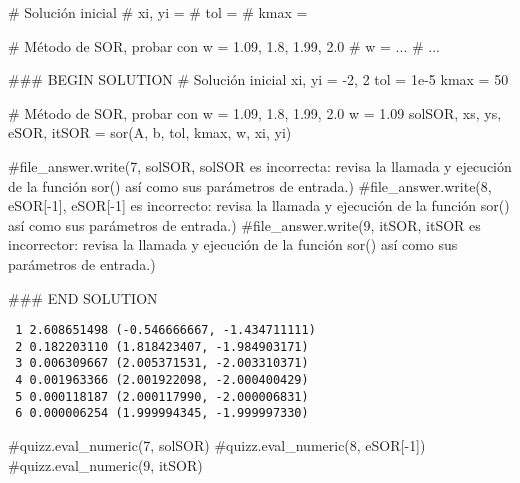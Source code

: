\documentclass[
  letterpaper,
  DIV=11,
  numbers=noendperiod]{scrreprt}
\newenvironment{Shaded}{\begin{snugshade}}{\end{snugshade}}
\newcommand{\CommentTok}[1]{\textcolor[rgb]{0.37,0.37,0.37}{#1}}
\newcommand{\DecValTok}[1]{\textcolor[rgb]{0.68,0.00,0.00}{#1}}
\newcommand{\FloatTok}[1]{\textcolor[rgb]{0.68,0.00,0.00}{#1}}
\newcommand{\NormalTok}[1]{\textcolor[rgb]{0.00,0.23,0.31}{#1}}
\newcommand{\OperatorTok}[1]{\textcolor[rgb]{0.37,0.37,0.37}{#1}}
\newcommand{\RegionMarkerTok}[1]{\textcolor[rgb]{0.00,0.23,0.31}{#1}}
\begin{document}
\begin{Shaded}
\begin{Highlighting}[]
\CommentTok{\# Solución inicial}
\CommentTok{\# xi, yi = }
\CommentTok{\# tol = }
\CommentTok{\# kmax = }

\CommentTok{\# Método de SOR, probar con w = 1.09, 1.8, 1.99, 2.0}
\CommentTok{\# w = ...}
\CommentTok{\# ...}

\CommentTok{\#\#\# }\RegionMarkerTok{BEGIN}\CommentTok{ SOLUTION}
\CommentTok{\# Solución inicial}
\NormalTok{xi, yi }\OperatorTok{=} \OperatorTok{{-}}\DecValTok{2}\NormalTok{, }\DecValTok{2}
\NormalTok{tol }\OperatorTok{=} \FloatTok{1e{-}5}
\NormalTok{kmax }\OperatorTok{=} \DecValTok{50}

\CommentTok{\# Método de SOR, probar con w = 1.09, 1.8, 1.99, 2.0}
\NormalTok{w }\OperatorTok{=} \FloatTok{1.09}
\NormalTok{solSOR, xs, ys, eSOR, itSOR }\OperatorTok{=}\NormalTok{ sor(A, b, tol, kmax, w, xi, yi)}

\CommentTok{\#file\_answer.write(\textquotesingle{}7\textquotesingle{}, solSOR, \textquotesingle{}solSOR es incorrecta: revisa la llamada y ejecución de la función sor() así como sus parámetros de entrada.\textquotesingle{})}
\CommentTok{\#file\_answer.write(\textquotesingle{}8\textquotesingle{}, eSOR[{-}1], \textquotesingle{}eSOR[{-}1] es incorrecto: revisa la llamada y ejecución de la función sor() así como sus parámetros de entrada.\textquotesingle{})}
\CommentTok{\#file\_answer.write(\textquotesingle{}9\textquotesingle{}, itSOR, \textquotesingle{}itSOR es incorrector: revisa la llamada y ejecución de la función sor() así como sus parámetros de entrada.\textquotesingle{})}

\CommentTok{\#\#\# }\RegionMarkerTok{END}\CommentTok{ SOLUTION}
\end{Highlighting}
\end{Shaded}

\begin{verbatim}
 1 2.608651498 (-0.546666667, -1.434711111)
 2 0.182203110 (1.818423407, -1.984903171)
 3 0.006309667 (2.005371531, -2.003310371)
 4 0.001963366 (2.001922098, -2.000400429)
 5 0.000118187 (2.000117990, -2.000006831)
 6 0.000006254 (1.999994345, -1.999997330)
\end{verbatim}

\begin{Shaded}
\begin{Highlighting}[]
\CommentTok{\#quizz.eval\_numeric(\textquotesingle{}7\textquotesingle{}, solSOR)}
\CommentTok{\#quizz.eval\_numeric(\textquotesingle{}8\textquotesingle{}, eSOR[{-}1])}
\CommentTok{\#quizz.eval\_numeric(\textquotesingle{}9\textquotesingle{}, itSOR)}
\end{Highlighting}
\end{Shaded}
\end{document}
